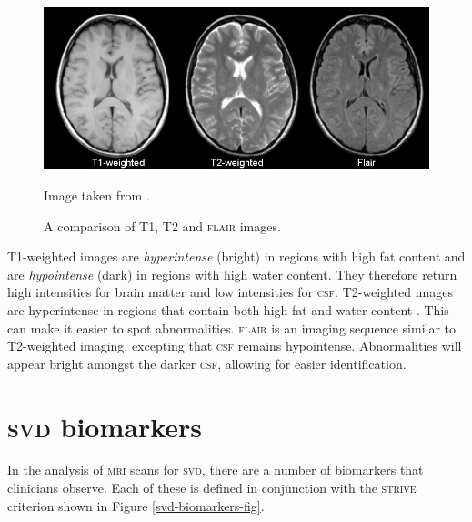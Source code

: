 \begin{figure}[ht]
	\centering
	\includegraphics[width=\textwidth]{Images/2_t1_t2_flair.jpg}
	\caption{A comparison of T1, T2 and \textsc{flair} images.}
	\small Image taken from \cite{Preston2006}.
	\label{svd-t1-vs-t2}
\end{figure}

T1-weighted images are \textit{hyperintense} (bright) in regions with high fat content and are \textit{hypointense} (dark) in regions with high water content. They therefore return high intensities for brain matter and low intensities for \textsc{csf}. T2-weighted images are hyperintense in regions that contain both high fat and water content \cite{Bitar2006}. This can make it easier to spot abnormalities. \textsc{flair} is an imaging sequence similar to T2-weighted imaging, excepting that \textsc{csf} remains hypointense. Abnormalities will appear bright amongst the darker \textsc{csf}, allowing for easier identification.

\section{\textsc{svd} biomarkers}\label{svd-markers}

In the analysis of \textsc{mri} scans for \textsc{svd}, there are a number of biomarkers that clinicians observe. Each of these is defined in conjunction with the \textsc{strive} criterion \cite{WardlawJ.M.2013Nsfr} shown in Figure \ref{svd-biomarkers-fig}.

